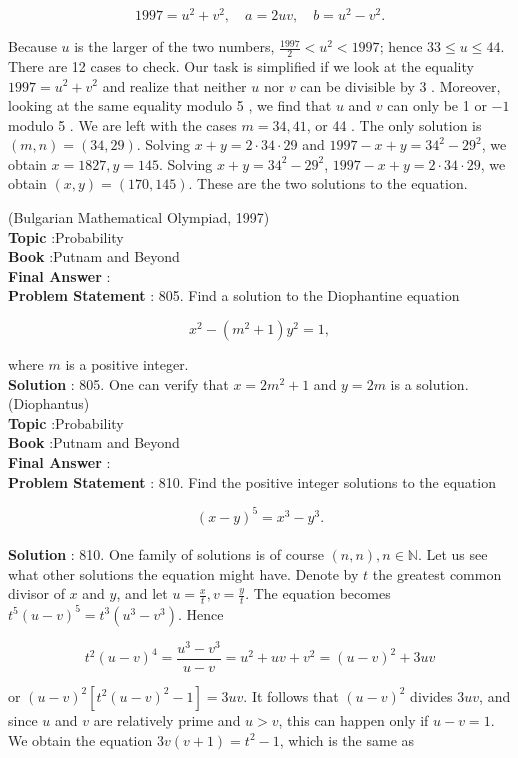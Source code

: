 \documentclass[10pt]{article}
\begin{document}
$$
1997=u^{2}+v^{2}, \quad a=2 u v, \quad b=u^{2}-v^{2} .
$$

Because $u$ is the larger of the two numbers, $\frac{1997}{2}<u^{2}<1997$; hence $33 \leq u \leq 44$. There are 12 cases to check. Our task is simplified if we look at the equality $1997=u^{2}+v^{2}$ and realize that neither $u$ nor $v$ can be divisible by 3 . Moreover, looking at the same equality modulo 5 , we find that $u$ and $v$ can only be 1 or $-1$ modulo 5 . We are left with the cases $m=34,41$, or 44 . The only solution is $(m, n)=(34,29)$. Solving $x+y=2 \cdot 34 \cdot 29$ and $1997-x+y=34^{2}-29^{2}$, we obtain $x=1827, y=145$. Solving $x+y=34^{2}-29^{2}$, $1997-x+y=2 \cdot 34 \cdot 29$, we obtain $(x, y)=(170,145)$. These are the two solutions to the equation.

(Bulgarian Mathematical Olympiad, 1997) 
\\
\textbf{Topic} :Probability\\
\textbf{Book} :Putnam and Beyond\\
\textbf{Final Answer} :\\


\textbf{Problem Statement} :
805. Find a solution to the Diophantine equation

$$
x^{2}-\left(m^{2}+1\right) y^{2}=1,
$$

where $m$ is a positive integer.
\\
\textbf{Solution} :
805. One can verify that $x=2 m^{2}+1$ and $y=2 m$ is a solution. (Diophantus)
\\
\textbf{Topic} :Probability\\
\textbf{Book} :Putnam and Beyond\\
\textbf{Final Answer} :\\


\textbf{Problem Statement} :
810. Find the positive integer solutions to the equation

$$
(x-y)^{5}=x^{3}-y^{3} .
$$
\\
\textbf{Solution} :
810. One family of solutions is of course $(n, n), n \in \mathbb{N}$. Let us see what other solutions the equation might have. Denote by $t$ the greatest common divisor of $x$ and $y$, and let $u=\frac{x}{t}, v=\frac{y}{t}$. The equation becomes $t^{5}(u-v)^{5}=t^{3}\left(u^{3}-v^{3}\right)$. Hence

$$
t^{2}(u-v)^{4}=\frac{u^{3}-v^{3}}{u-v}=u^{2}+u v+v^{2}=(u-v)^{2}+3 u v
$$

or $(u-v)^{2}\left[t^{2}(u-v)^{2}-1\right]=3 u v$. It follows that $(u-v)^{2}$ divides $3 u v$, and since $u$ and $v$ are relatively prime and $u>v$, this can happen only if $u-v=1$. We obtain the equation $3 v(v+1)=t^{2}-1$, which is the same as
\end{document}
